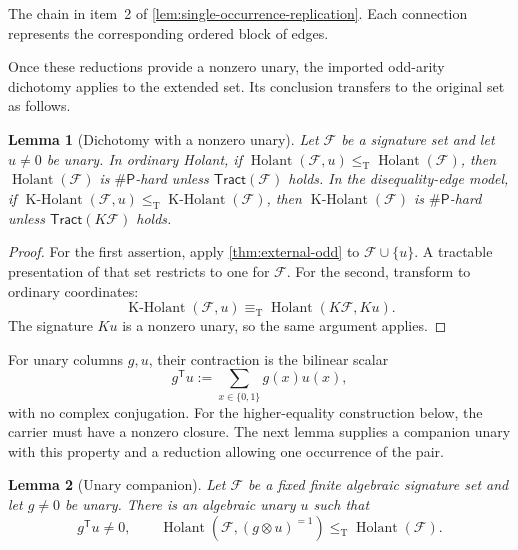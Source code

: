 \documentclass[11pt,letterpaper,onecolumn]{article}
\theoremstyle{plain}
\newtheorem{lemma}[lemma]{Lemma}
\theoremstyle{definition}
\theoremstyle{remark}
\newcommand{\cF}{\mathcal F}
\newcommand{\Holant}{\operatorname{Holant}}
\newcommand{\KHolant}{\operatorname{K\text{-}Holant}}
\newcommand{\Tract}{\mathsf{Tract}}
\newcommand{\SharpP}{\#\mathsf P}
\newcommand{\leT}{\leq_{\mathrm T}}
\newcommand{\equivT}{\equiv_{\mathrm T}}
\begin{document}
\begin{center}
\par\normalsize The chain in item~2 of \cref{lem:single-occurrence-replication}.
Each connection represents the corresponding ordered block of edges.
\end{center}


Once these reductions provide a nonzero unary, the imported odd-arity
dichotomy applies to the extended set. Its conclusion transfers to the
original set as follows.

\begin{lemma}[Dichotomy with a nonzero unary]
\label{lem:common-unary-exit}
Let \(\cF\) be a signature set and let \(u\ne0\) be unary.
In ordinary Holant,
if \(\Holant(\cF,u)\leT\Holant(\cF)\), then
\(\Holant(\cF)\) is \(\SharpP\)-hard unless \(\Tract(\cF)\) holds. In the disequality-edge model,
if \(\KHolant(\cF,u)\leT\KHolant(\cF)\), then
\(\KHolant(\cF)\) is \(\SharpP\)-hard unless \(\Tract(K\cF)\) holds.
\end{lemma}

\begin{proof}
For the first assertion, apply \cref{thm:external-odd} to
\(\cF\cup\{u\}\).  A tractable presentation of that set restricts to one for
\(\cF\).  For the second, transform to ordinary coordinates:
\[
  \KHolant(\cF,u)
  \equivT
  \Holant(K\cF,Ku).
\]
The signature \(Ku\) is a nonzero unary, so the same argument applies.
\end{proof}

For unary columns \(g,u\), their contraction is the bilinear scalar
\[
  g^{\mathsf T}u:=\sum_{x\in\{0,1\}}g(x)u(x),
\]
with no complex conjugation.
For the higher-equality construction below, the carrier must have a
nonzero closure. The next lemma supplies a companion unary with this
property and a reduction allowing one occurrence of the pair.

\begin{lemma}[Unary companion]
\label{lem:unary-companion}
Let \(\cF\) be a fixed finite algebraic signature set and let \(g\ne0\) be
unary.  There is an algebraic unary \(u\) such that
\[
  g^{\mathsf T}u\ne0,
  \qquad
  \Holant(\cF,(g\otimes u)^{=1})\leT\Holant(\cF).
\]
\end{lemma}
\end{document}

